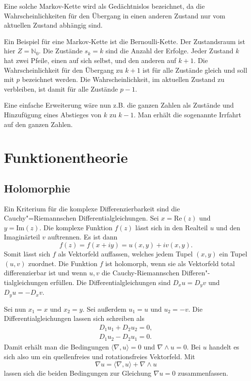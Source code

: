 \documentclass[a4paper,10pt,fleqn,twocolumn,twoside]{article}
\begin{document}
Eine solche Markov-Kette wird als Gedächtnislos bezeichnet, da
die Wahrscheinlichkeiten für den Übergang in einen anderen Zustand
nur vom aktuellen Zustand abhängig sind.

Ein Beispiel für eine Markov-Kette ist die Bernoulli-Kette.
Der Zustandsraum ist hier \(Z=\mathbb{N}_0\). Die Zustände \(s_k=k\)
sind die Anzahl der Erfolge. Jeder Zustand \(k\) hat zwei Pfeile,
einen auf sich selbst, und den anderen auf \(k+1\). Die
Wahrscheinlichkeit für den Übergang zu \(k+1\) ist für alle Zustände
gleich und soll mit \(p\) bezeichnet werden. Die Wahrscheinlichkeit,
im aktuellen Zustand zu verbleiben, ist damit für alle
Zustände \(p-1\).

Eine einfache Erweiterung wäre nun z.B. die ganzen Zahlen als
Zustände und Hinzufügung eines Abstieges von \(k\) zu \(k-1\).
Man erhält die sogenannte Irrfahrt auf den ganzen Zahlen.


\newpage
\section{Funktionentheorie}
\subsection{Holomorphie}

Ein Kriterium für die komplexe Differenzierbarkeit sind die
Cauchy"=Riemannschen Differentialgleichungen. Sei \(x=\mathrm{Re}(z)\)
und \(y=\mathrm{Im}(z)\). Die komplexe Funktion \(f(z)\) lässt sich
in den Realteil \(u\) und den Imaginärteil \(v\) auftrennen. Es ist
dann
\[f(z) = f(x+iy) = u(x,y)+iv(x,y).\]
Somit lässt sich \(f\) als Vektorfeld auffassen, welches jedem Tupel
\((x,y)\) ein Tupel \((u,v)\) zuordnet. Die Funktion \(f\) ist
holomorph, wenn sie als Vektorfeld total differenzierbar ist und
wenn \(u,v\) die Cauchy-Riemannschen Differen"-tialgleichungen
erfüllen. Die Differentialgleichungen sind \(D_x u=D_y v\) und
\(D_y u = -D_x v\).

Sei nun \(x_1=x\) und \(x_2=y\). Sei außerdem \(u_1=u\)
und \(u_2=-v\). Die Differentialgleichungen lassen sich schreiben als
\begin{gather*}
D_1u_1+D_2u_2=0,\\
D_1u_2-D_2u_1=0.
\end{gather*}
Damit erhält man die Bedingungen \(\langle\nabla,u\rangle=0\) und
\(\nabla\wedge u=0\). Bei \(u\) handelt es sich also um ein
quellenfreies und rotationsfreies Vektorfeld. Mit
\[\nabla u = \langle\nabla, u\rangle+\nabla\wedge u\]
lassen sich die beiden Bedingungen zur Gleichung \(\nabla u=0\)
zusammenfassen.
\end{document}
